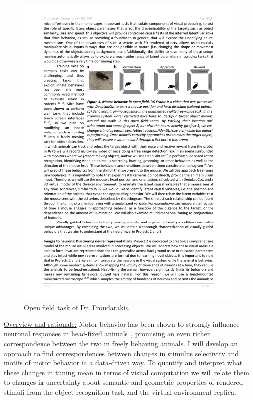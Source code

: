 \documentclass[COG,11pt]{ercgrant}
\begin{document}
\begin{figure}
\vspace{-2ex}
\includegraphics[width=\linewidth,trim=0 15 0 5, clip]{figures/openfield_ar.pdf}
\caption{Open field task of Dr. Froudarakis.}
\label{fig:openfield}
\end{figure}

\underline{Overview and rationale:} 
Motor behavior has been shown to strongly influence neuronal responses in head-fixed animals~\parencite{Chiappe2010-bm, Bezdudnaya2006-ge, Andermann2011-vw, Treue1996-lp,Franke2022-do, Musall2019-kd}, promising an even richer correspondence between the two in freely behaving animals. 
I will develop an approach to find correspondences between changes in stimulus selectivity and motifs of motor behavior in a data-driven way.
To quantify and interpret what these changes in tuning mean in terms of visual computation we will relate them to changes in uncertainty about semantic and geometric properties of rendered stimuli from the object recognition task and the virtual environment replica.
\end{document}
